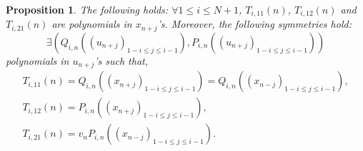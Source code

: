 \documentclass[pdftex]{sigma}%
\numberwithin{equation}{section}
\newtheorem{Proposition}[Theorem]{Proposition}
 { \theoremstyle{definition}
\newtheorem{Definition}[Theorem]{Definition}
\newtheorem{Note}[Theorem]{Note}
\newtheorem{Example}[Theorem]{Example}
\newtheorem{problem}[Theorem]{Riemann--Hilbert Problem}
\newtheorem{Remark}[Theorem]{Remark} }
\begin{document}
\begin{Proposition}
\label{prop:symTi1221}
The following holds:
$\forall 1\leqslant i \leqslant N+1$, $T_{i,11}(n)$, $T_{i,12}(n)$ and $T_{i,21}(n)$ are polynomials in $x_{n+j}$'s. Moreover, the following symmetries hold:
\begin{equation*}
\exists (Q_{i,n}((u_{n+j})_{1-i\leqslant j\leqslant i-1}),P_{i,n}((u_{n+j})_{1-i\leqslant j\leqslant i-1}))
\end{equation*}
polynomials in $u_{n+j}$'s such that,
\begin{gather*}
T_{i,11}(n)=Q_{i,n}((x_{n+j})_{1-i\leqslant j\leqslant i-1})
=Q_{i,n}((x_{n-j})_{1-i\leqslant j\leqslant i-1}),
\\
T_{i,12}(n)=P_{i,n}((x_{n+j})_{1-i\leqslant j\leqslant i-1}),
\\
T_{i,21}(n)=v_nP_{i,n}((x_{n-j})_{1-i\leqslant j\leqslant i-1}).
\end{gather*}
\end{Proposition}
\end{document}
